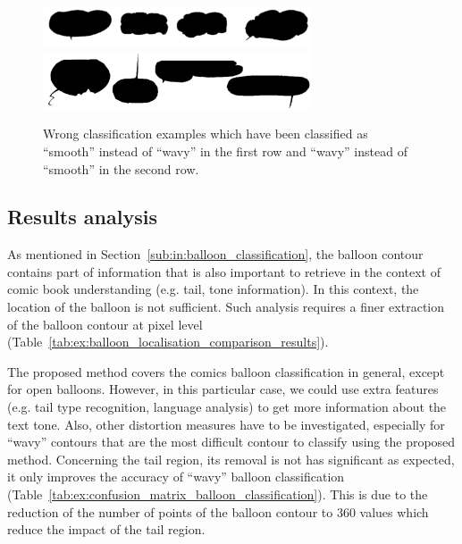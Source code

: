   \begin{figure}[h]  %
    \centering
    \includegraphics[trim = 0mm 0mm 0mm 0mm, clip, width=300px]{bad_detection.png}
    \includegraphics[trim = 0mm 0mm 0mm 0mm, clip, width=300px]{wavy_instead_smooth.png}
    \caption[Wrong balloon classification examples]{Wrong classification examples which have been classified as ``smooth'' instead of  ``wavy'' in the first row and ``wavy'' instead of  ``smooth'' in the second row.}
    \label{fig:bad_detection_balloon_classification}
  \end{figure}


\subsection{Results analysis} %
\label{par:balloon_classification_analysis}

As mentioned in Section~\ref{sub:in:balloon_classification}, the balloon contour contains part of information that is also important to retrieve in the context of comic book understanding (e.g. tail, tone information).
In this context, the location of the balloon is not sufficient.
Such analysis requires a finer extraction of the balloon contour at pixel level (Table~\ref{tab:ex:balloon_localisation_comparison_results}).

The proposed method covers the comics balloon classification in general, except for open balloons.
However, in this particular case, we could use extra features (e.g. tail type recognition, language analysis) to get more information about the text tone.
Also, other distortion measures have to be investigated, especially for ``wavy'' contours that are the most difficult contour to classify using the proposed method.
Concerning the tail region, its removal is not has significant as expected, it only improves the accuracy of ``wavy'' balloon classification (Table~\ref{tab:ex:confusion_matrix_balloon_classification}).
This is due to the reduction of the number of points of the balloon contour to 360 values which reduce the impact of the tail region.

